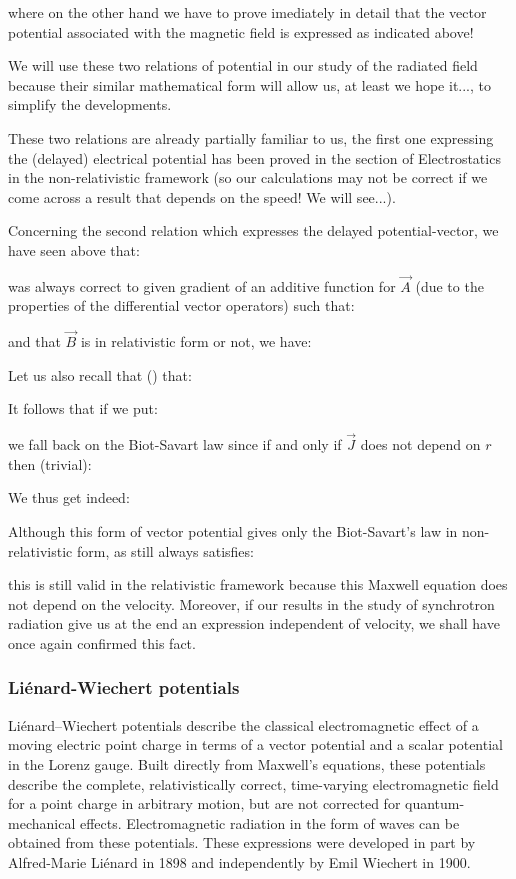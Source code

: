 	where on the other hand we have to prove imediately in detail that the vector potential associated with the magnetic field is expressed as indicated above!
	\begin{tcolorbox}[title=Remark,colframe=black,arc=10pt]
	We will use these two relations of potential in our study of the radiated field because their similar mathematical form will allow us, at least we hope it..., to simplify the developments.
	\end{tcolorbox}
	These two relations are already partially familiar to us, the first one expressing the (delayed) electrical potential has been proved in the section of Electrostatics in the non-relativistic framework (so our calculations may not be correct if we come across a result that depends on the speed! We will see...).

	Concerning the second relation which expresses the delayed potential-vector, we have seen above that:
	
	was always correct to given gradient of an additive function for $\vec{A}$ (due to the properties of the differential vector operators) such that:
	
	and that $\vec{B}$ is in relativistic form or not, we have:
	
	Let us also recall that () that:
	
	It follows that if we put:
	
	we fall back on the Biot-Savart law since if and only if $\vec{J}$ does not depend on $r$ then (trivial):
	
	We thus get indeed:
	
	Although this form of vector potential gives only the Biot-Savart's law in non-relativistic form, as still always satisfies:
	
	this is still valid in the relativistic framework because this Maxwell equation does not depend on the velocity. Moreover, if our results in the study of synchrotron radiation give us at the end an expression independent of velocity, we shall have once again confirmed this fact.

	\subsubsection{Liénard-Wiechert potentials}
	Liénard–Wiechert potentials describe the classical electromagnetic effect of a moving electric point charge in terms of a vector potential and a scalar potential in the Lorenz gauge. Built directly from Maxwell's equations, these potentials describe the complete, relativistically correct, time-varying electromagnetic field for a point charge in arbitrary motion, but are not corrected for quantum-mechanical effects. Electromagnetic radiation in the form of waves can be obtained from these potentials. These expressions were developed in part by Alfred-Marie Liénard in 1898 and independently by Emil Wiechert in 1900.
	
